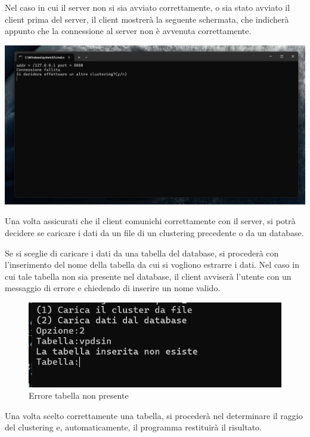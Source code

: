 \begin{tcolorbox}[  colback=white!5!white, colframe=gray, title={Avvertenza} ]

    Nel caso in cui il server non si sia avviato correttamente, o sia stato avviato il client prima del server, il client mostrerà la seguente schermata, che indicherà appunto che la connessione al server non è avvenuta correttamente.
    
    \begin{center} 
        \includegraphics[width = 0.5 \textwidth]{images/connessione fallita.png}
    \end{center}
        
\end{tcolorbox}

Una volta assicurati che il client comunichi correttamente con il server, si potrà decidere se caricare i dati da un file di un clustering precedente o da un database.


Se si sceglie di caricare i dati da una tabella del database, si procederà con l'inserimento del nome della tabella da cui si vogliono estrarre i dati. Nel caso in cui tale tabella non sia presente nel database, il client avviserà l'utente con un messaggio di errore e chiedendo di inserire un nome valido. 

\begin{figure}[h!]
    \centering
    \includegraphics[width = 0.5 \textwidth]{images/teabella inesistente.png}
    \caption{Errore tabella non presente}
\end{figure}

Una volta scelto correttamente una tabella, si procederà nel determinare il raggio del clustering e, automaticamente, il programma restituirà il risultato. 

